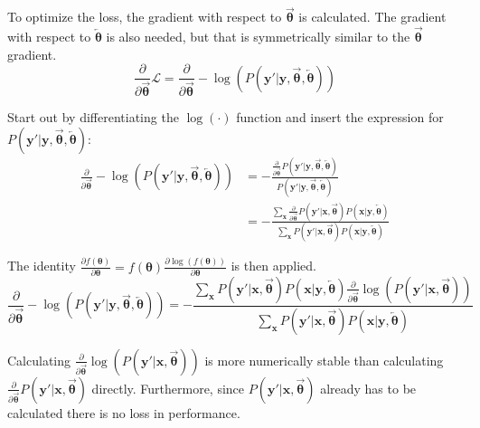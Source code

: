 To optimize the loss, the gradient with respect to $\overrightarrow{\boldsymbol\theta}$ is calculated. The gradient with respect to $\overleftarrow{\boldsymbol\theta}$ is also needed, but that is symmetrically similar to the $\overrightarrow{\boldsymbol\theta}$ gradient.
\begin{equation}
\frac{\partial}{\partial \overrightarrow{\boldsymbol\theta}} \mathcal{L} = \frac{\partial}{\partial \overrightarrow{\boldsymbol\theta}} -\log(P(\mathbf{y}'|\mathbf{y}, \overrightarrow{\boldsymbol\theta}, \overleftarrow{\boldsymbol\theta}))
\end{equation}

Start out by differentiating the $\log(\cdot)$ function and insert the expression for $P(\mathbf{y}'|\mathbf{y}, \overrightarrow{\boldsymbol\theta}, \overleftarrow{\boldsymbol\theta})$:
\begin{equation}
\begin{aligned}
\frac{\partial}{\partial \overrightarrow{\boldsymbol\theta}} -\log(P(\mathbf{y}'|\mathbf{y}, \overrightarrow{\boldsymbol\theta}, \overleftarrow{\boldsymbol\theta}))
&= - \frac{\frac{\partial}{\partial \overrightarrow{\boldsymbol\theta}} P(\mathbf{y}'|\mathbf{y}, \overrightarrow{\boldsymbol\theta}, \overleftarrow{\boldsymbol\theta})}{P(\mathbf{y}'|\mathbf{y}, \overrightarrow{\boldsymbol\theta}, \overleftarrow{\boldsymbol\theta})} \\
&= - \frac{\sum_{\mathbf{x}} \frac{\partial}{\partial \overrightarrow{\boldsymbol\theta}} P(\mathbf{y}'|\mathbf{x}, \overrightarrow{\boldsymbol\theta}) P(\mathbf{x}|\mathbf{y}, \overleftarrow{\boldsymbol\theta})}{\sum_{\mathbf{x}} P(\mathbf{y}'|\mathbf{x}, \overrightarrow{\boldsymbol\theta}) P(\mathbf{x}|\mathbf{y}, \overleftarrow{\boldsymbol\theta})}
\end{aligned}
\end{equation}

The identity $\frac{\partial f({\boldsymbol\theta})}{\partial {\boldsymbol\theta}} = f({\boldsymbol\theta}) \frac{\partial \log(f({\boldsymbol\theta}))}{\partial {\boldsymbol\theta}}$ \cite{deeplearning} is then applied.
\begin{equation}
\frac{\partial}{\partial \overrightarrow{\boldsymbol\theta}} -\log(P(\mathbf{y}'|\mathbf{y}, \overrightarrow{\boldsymbol\theta}, \overleftarrow{\boldsymbol\theta})) = - \frac{\sum_{\mathbf{x}} P(\mathbf{y}'|\mathbf{x}, \overrightarrow{\boldsymbol\theta}) P(\mathbf{x}|\mathbf{y}, \overleftarrow{\boldsymbol\theta}) \frac{\partial}{\partial \overrightarrow{\boldsymbol\theta}} \log(P(\mathbf{y}'|\mathbf{x}, \overrightarrow{\boldsymbol\theta})) }{\sum_{\mathbf{x}} P(\mathbf{y}'|\mathbf{x}, \overrightarrow{\boldsymbol\theta}) P(\mathbf{x}|\mathbf{y}, \overleftarrow{\boldsymbol\theta})}
\end{equation}

Calculating $\frac{\partial}{\partial \overrightarrow{\boldsymbol\theta}} \log(P(\mathbf{y}'|\mathbf{x}, \overrightarrow{\boldsymbol\theta}))$ is more numerically stable than calculating $\frac{\partial}{\partial \overrightarrow{\boldsymbol\theta}} P(\mathbf{y}'|\mathbf{x}, \overrightarrow{\boldsymbol\theta})$ directly. Furthermore, since $P(\mathbf{y}'|\mathbf{x}, \overrightarrow{\boldsymbol\theta})$ already has to be calculated there is no loss in performance.
